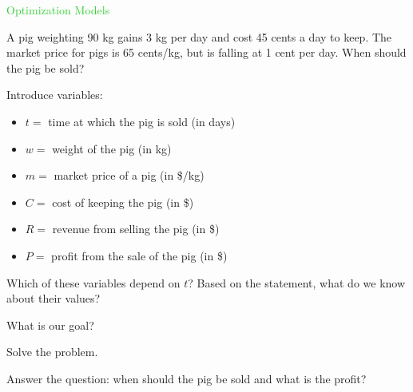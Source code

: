 

%
%
%
%




\begin{slide}

\begin{slidesonly}
	\vspace{3cm}
\end{slidesonly}

\begin{center}
\Huge 
\textcolor{LimeGreen}{Optimization Models}
\end{center}

	
\end{slide}





\begin{slide}

\question

\begin{problem}
A pig weighting 90 kg gains 3 kg per day and cost 45 cents a day to keep. The market price for pigs is 65 cents/kg, but is falling at 1 cent per day. When should the pig be sold?	
\end{problem}

Introduce variables:
\begin{itemize}
	\item $t=$ time at which the pig is sold (in days)
	\item $w=$ weight of the pig (in kg)
	\item $m=$ market price of a pig (in \$/kg)
	\item $C=$ cost of keeping the pig (in \$)
	\item $R=$ revenue from selling the pig (in \$)
	\item $P=$ profit from the sale of the pig (in \$)
\end{itemize}
	

\begin{parts}
	\item Which of these variables depend on $t$? Based on the statement, what do we know about their values?
	\item What is our goal?
	\item Solve the problem.
	\item Answer the question: when should the pig be sold and what is the profit?
\end{parts}

\end{slide}




